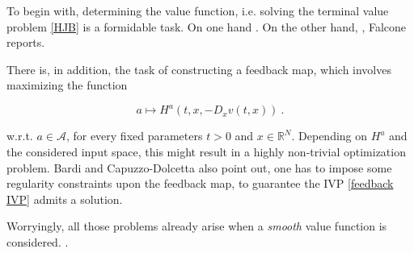 To begin with, determining the value function, i.e. solving the terminal value problem \eqref{HJB} is a formidable task. On one hand  \cite{zhou}. On the other hand, , Falcone \cite{bardi2008optimal} reports.

There is, in addition, the task of constructing a feedback map, which involves maximizing the function

\begin{equation*}
	a \mapsto H^{a}(t, x, -D_x v(t, x)) \ .
\end{equation*}

w.r.t. $ a \in \mathcal{A} $, for every fixed parameters $ t > 0 $ and $ x \in \mathbb{R}^N $. Depending on $ H^{a} $ and the considered input space, this might result in a highly non-trivial optimization problem. Bardi and Capuzzo-Dolcetta \cite{bardi2008optimal} also point out, one has to impose some regularity constraints upon the feedback map, to guarantee the IVP \eqref{feedback IVP} admits a solution.

Worryingly, all those problems already arise when a \emph{smooth} value function is considered.  \cite{bardi2008optimal}.


